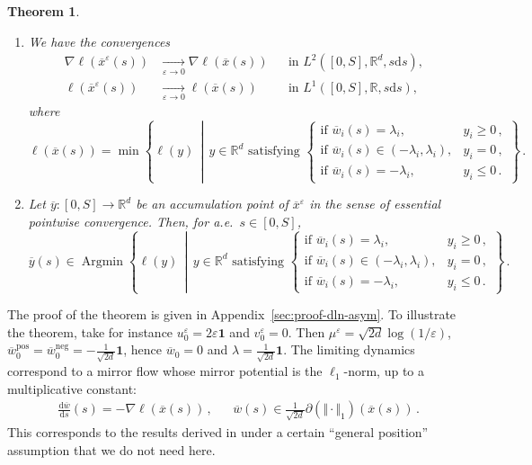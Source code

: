 \documentclass[11pt,english,reqno]{article}
\DeclareMathOperator{\Argmin}{Argmin}
\newcommand{\diff}{\mathrm{d}}
\newcommand{\R}{\mathbb{R}}
\newcommand{\pos}{\text{pos}}
\renewcommand{\neg}{\text{neg}}
\renewcommand{\leq}{\leqslant}
\renewcommand{\geq}{\geqslant}
\theoremstyle{plain}
\newtheorem{thm}[proposition]{Theorem}
\theoremstyle{definition}
\theoremstyle{remark}
\numberwithin{equation}{section}
\begin{document}
\begin{thm}
\begin{enumerate}[label=(\alph*)]
		\item We have the convergences
		\begin{align*}
			\nabla \ell(\overline{x}^\varepsilon(s))
			&\xrightarrow[\varepsilon\to 0]{}
			\nabla \ell(\overline{x}(s))
			&&\text{in } L^2([0,S],\R^d, s\diff s),\\
			\ell(\overline{x}^\varepsilon(s))
			&\xrightarrow[\varepsilon\to 0]{}
			\ell(\overline{x}(s))
			&&\text{in } L^1([0,S],\R, s\diff s),
	\end{align*}
	where 
	\begin{equation*}
		\ell(\overline{x}(s)) = \min \left\{\ell(y)\,\middle|\, y\in \R^d \text{ satisfying }\begin{cases}
		\text{if }\overline{w}_i(s) = \lambda_i, & y_i \geq 0 \, , \\
		\text{if }\overline{w}_i(s) \in (-\lambda_i, \lambda_i), & y_i = 0 \, , \\
		\text{if }\overline{w}_i(s) = -\lambda_i, & y_i \leq 0 \, .
		\end{cases}\right\} \, .
	\end{equation*}
	\item Let $\overline{y}:[0,S]\to\R^d$ be an accumulation point of $\overline{x}^\varepsilon$ in the sense of essential pointwise convergence. Then, for a.e.~$s \in [0,S]$,
	\begin{equation*}
		\overline{y}(s) \in \Argmin\left\{\ell(y)\,\middle|\, y\in \R^d \text{ satisfying }\begin{cases}
		\text{if }\overline{w}_i(s) = \lambda_i, & y_i \geq 0 \, , \\
		\text{if }\overline{w}_i(s) \in (-\lambda_i, \lambda_i), & y_i = 0 \, , \\
		\text{if }\overline{w}_i(s) = -\lambda_i, & y_i \leq 0 \, .
		\end{cases}\right\} \, .
	\end{equation*}
	\end{enumerate} 
\end{thm}
The proof of the theorem is given in Appendix~\ref{sec:proof-dln-asym}. To illustrate the theorem, take for instance $u^\varepsilon_0 = 2 \varepsilon \mathbf{1}$ and $v^\varepsilon_0 = 0$. Then $\mu^\varepsilon = \sqrt{2d}\log(1/\varepsilon)$, $\overline{w}_0^\pos = \overline{w}_0^\neg = -\frac{1}{\sqrt{2d}} \mathbf{1}$, hence $\overline{w}_0 = 0$ and $\lambda = \frac{1}{\sqrt{2d}} \mathbf{1}$. The limiting dynamics correspond to a mirror flow whose mirror potential is the $\ell_1$-norm, up to a multiplicative constant:
\begin{align}
	\label{eq:iss}
	&\frac{\diff \overline{w}}{\diff s} (s) = - \nabla \ell(\overline{x}(s)) \, , &&\overline{w}(s) \in \frac{1}{\sqrt{2d}}\partial\left(\Vert \cdot \Vert_1\right)(\overline{x}(s)) \, .
\end{align}
This corresponds to the results derived in \cite{pesme2023saddle} under a certain ``general position'' assumption that we do not need here.
\end{document}
